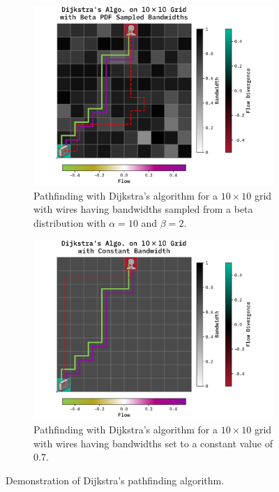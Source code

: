 \documentclass[10pt, titlepage, a4paper]{article}
\begin{document}
\begin{figure}[H]
    \centering
    \begin{subfigure}[t]{0.45\textwidth}
        \includegraphics[width=\textwidth]{../Images/dijkstra-test-beta.pdf}
        \caption{Pathfinding with Dijkstra's algorithm for a $10\times 10$ grid with wires having bandwidths sampled from a beta distribution with $\alpha = 10$ and $\beta = 2$.}
        \label{fig:dijsktra-beta}
    \end{subfigure}\hspace{1.0cm}
    \begin{subfigure}[t]{0.45\textwidth}
        \includegraphics[width=\textwidth]{../Images/dijkstra-test-const.pdf}
        \caption{Pathfinding with Dijkstra's algorithm for a $10\times 10$ grid with wires having bandwidths set to a constant value of $0.7$.}
        \label{fig:dijsktra-const}
    \end{subfigure}
    \caption{Demonstration of Dijkstra's pathfinding algorithm.}
    \label{fig:dijsktra}
\end{figure}
\end{document}
